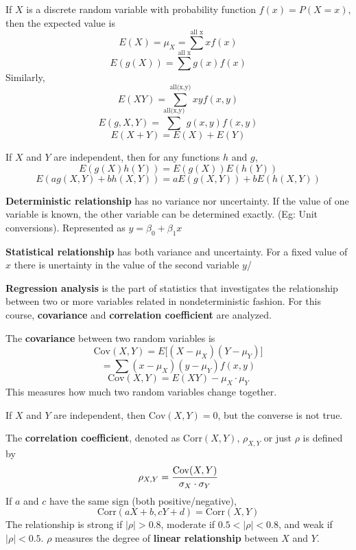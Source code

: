 \documentclass[english, 12pt]{article}
\begin{document}

\begin{defn}
If $X$ is a discrete random variable with probability function $f(x) = P(X = x)$, then the expected value is
\[E(X) = \mu_X = \sum^{\text{all x}} x f(x)\]
\[E(g(X)) = \sum^{\text{all x}} g(x) f(x)\]
Similarly,
\[E(XY) = \sum^{\text{all(x,y)}} xy f(x,y)\]
\[E(g,X,Y) = \sum^{\text{all(x,y)}} g(x,y) f(x,y)\]
\[E(X+Y) = E(X) + E(Y)\]
\end{defn}

If $X$ and $Y$ are independent, then for any functions $h$ and $g$,
\[E(g(X) h(Y)) = E(g(X)) E(h(Y))\]
\[E(ag(X,Y) + b h(X,Y)) = a E(g(X,Y)) + b E(h(X,Y))\]

\begin{defn}
\textbf{Deterministic relationship} has no variance nor uncertainty. If the value of one variable is known, the other variable can be determined exactly. (Eg: Unit conversions). Represented as $y = \beta_0 + \beta_{1} x$
\end{defn}

\begin{defn}
\textbf{Statistical relationship} has both variance and uncertainty. For a fixed value of $x$ there is unertainty in the value of the second variable $y$/
\end{defn}

\begin{defn}
\textbf{Regression analysis} is the part of statistics that investigates the relationship between two or more variables related in nondeterministic fashion. For this course, \textbf{covariance} and \textbf{correlation coefficient} are analyzed.
\end{defn}

\begin{defn}
The \textbf{covariance} between two random variables is
\[\text{Cov}(X,Y) = E \lbrack (X - \mu_X)(Y - \mu_Y) \rbrack\]
\[= \sum (x - \mu_X)(y-\mu_Y) f(x,y)\]
\[\text{Cov}(X,Y) = E(XY) - \mu_X \cdot \mu_Y\]
This measures how much two random variables change together.
\end{defn}

\begin{note}
If $X$ and $Y$ are independent, then $\text{Cov}(X,Y) = 0$, but the converse is not true.
\end{note}

\begin{defn}
The \textbf{correlation coefficient}, denoted as $\text{Corr}(X,Y)$, $\rho_{X,Y}$ or just $\rho$ is defined by
\[\rho_{X,Y} = \frac{\text{Cov}(X,Y)}{\sigma_X \cdot \sigma_Y}\]
If $a$ and $c$ have the same sign (both positive/negative),
\[\text{Corr}(aX+b,cY+d) = \text{Corr}(X,Y)\]
The relationship is strong if $|\rho| > 0.8$, moderate if $0.5 < |\rho| < 0.8$, and weak if $|\rho| < 0.5$.
$\rho$ measures the degree of \textbf{linear relationship} between $X$ and $Y$.
\end{defn}
\end{document}
